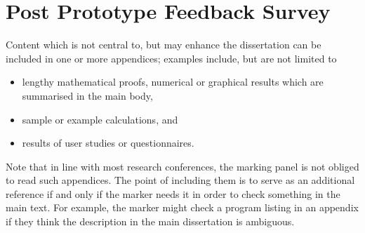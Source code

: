 \documentclass[oneside,%
                    author={Malak Hajji},
                    degree={BSc},
                    title={Designing An Accessible Computational Toolkit For Students},
                  subtitle={With Mixed Visual Abilities}]{dissertation}
\begin{document}
\backmatter





\appendix

\chapter{Post Prototype Feedback Survey}
\label{appx:survey}

Content which is not central to, but may enhance the dissertation can be 
included in one or more appendices; examples include, but are not limited
to

\begin{itemize}
\item lengthy mathematical proofs, numerical or graphical results which 
      are summarised in the main body,
\item sample or example calculations, 
      and
\item results of user studies or questionnaires.
\end{itemize}

\noindent
Note that in line with most research conferences, the marking panel is not
obliged to read such appendices. The point of including them is to serve as
an additional reference if and only if the marker needs it in order to check
something in the main text. For example, the marker might check a program listing 
in an appendix if they think the description in the main dissertation is ambiguous.

\end{document}

